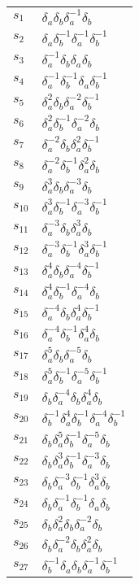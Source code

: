 \documentclass{article}
\begin{document}
\begin{center}
\begin{tabular}{ll}
\midrule
$s_{1}$ & $\delta_a^{}\delta_b^{}\delta_a^{-1}\delta_b^{}$ \\
$s_{2}$ & $\delta_a^{}\delta_b^{-1}\delta_a^{-1}\delta_b^{-1}$ \\
$s_{3}$ & $\delta_a^{-1}\delta_b^{}\delta_a^{}\delta_b^{}$ \\
$s_{4}$ & $\delta_a^{-1}\delta_b^{-1}\delta_a^{}\delta_b^{-1}$ \\
$s_{5}$ & $\delta_a^{2}\delta_b^{}\delta_a^{-2}\delta_b^{-1}$ \\
$s_{6}$ & $\delta_a^{2}\delta_b^{-1}\delta_a^{-2}\delta_b^{}$ \\
$s_{7}$ & $\delta_a^{-2}\delta_b^{}\delta_a^{2}\delta_b^{-1}$ \\
$s_{8}$ & $\delta_a^{-2}\delta_b^{-1}\delta_a^{2}\delta_b^{}$ \\
$s_{9}$ & $\delta_a^{3}\delta_b^{}\delta_a^{-3}\delta_b^{}$ \\
$s_{10}$ & $\delta_a^{3}\delta_b^{-1}\delta_a^{-3}\delta_b^{-1}$ \\
$s_{11}$ & $\delta_a^{-3}\delta_b^{}\delta_a^{3}\delta_b^{}$ \\
$s_{12}$ & $\delta_a^{-3}\delta_b^{-1}\delta_a^{3}\delta_b^{-1}$ \\
$s_{13}$ & $\delta_a^{4}\delta_b^{}\delta_a^{-4}\delta_b^{-1}$ \\
$s_{14}$ & $\delta_a^{4}\delta_b^{-1}\delta_a^{-4}\delta_b^{}$ \\
$s_{15}$ & $\delta_a^{-4}\delta_b^{}\delta_a^{4}\delta_b^{-1}$ \\
$s_{16}$ & $\delta_a^{-4}\delta_b^{-1}\delta_a^{4}\delta_b^{}$ \\
$s_{17}$ & $\delta_a^{5}\delta_b^{}\delta_a^{-5}\delta_b^{}$ \\
$s_{18}$ & $\delta_a^{5}\delta_b^{-1}\delta_a^{-5}\delta_b^{-1}$ \\
$s_{19}$ & $\delta_b^{}\delta_a^{-4}\delta_b^{}\delta_a^{4}\delta_b^{}$ \\
$s_{20}$ & $\delta_b^{-1}\delta_a^{4}\delta_b^{-1}\delta_a^{-4}\delta_b^{-1}$ \\
$s_{21}$ & $\delta_b^{}\delta_a^{5}\delta_b^{-1}\delta_a^{-5}\delta_b^{}$ \\
$s_{22}$ & $\delta_b^{}\delta_a^{3}\delta_b^{-1}\delta_a^{-3}\delta_b^{}$ \\
$s_{23}$ & $\delta_b^{}\delta_a^{-3}\delta_b^{-1}\delta_a^{3}\delta_b^{}$ \\
$s_{24}$ & $\delta_b^{}\delta_a^{-1}\delta_b^{-1}\delta_a^{}\delta_b^{}$ \\
$s_{25}$ & $\delta_b^{}\delta_a^{2}\delta_b^{}\delta_a^{-2}\delta_b^{}$ \\
$s_{26}$ & $\delta_b^{}\delta_a^{-2}\delta_b^{}\delta_a^{2}\delta_b^{}$ \\
$s_{27}$ & $\delta_b^{-1}\delta_a^{}\delta_b^{}\delta_a^{-1}\delta_b^{-1}$ \\
\bottomrule
\end{tabular}
\end{center}

\thispagestyle{empty}
\end{document}
